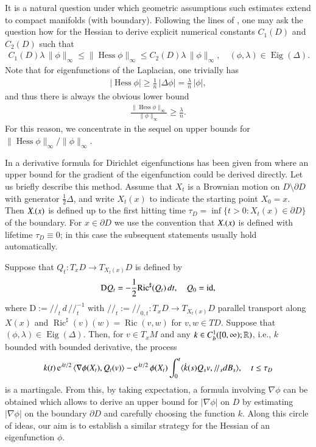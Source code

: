 \documentclass[11pt,reqno]{amsart}
\theoremstyle{definition} \newtheorem{remark}[theorem]{Remark}
\numberwithin{equation}{section}
\def\Ric{{\operatorname{Ric}}} \def\Hess{\operatorname{Hess}}
\newcommand\1{\mathbbm{1}}
\def\Ric{{\operatorname{Ric}}} \def\Aut{{\operatorname{Aut}}}
\def\Eig{\operatorname{Eig}} \def\II{{\operatorname{II}}}
\def\mathpal#1{\mathop{\mathchoice{\text{\rm #1}}%
    {\text{\rm #1}}{\text{\rm #1}}%
    {\text{\rm #1}}}\nolimits} \def\id{{\mathpal{id}}}
\newcommand{\ptr}{/\!/}
\def\II{{\operatorname{II}}}
\def\id{{\mathpal{id}}}
\def\mathpal#1{\mathop{\mathchoice{\text{\rm #1}}%
      {\text{\rm #1}}{\text{\rm #1}}%
      {\text{\rm #1}}}\nolimits}
\begin{document}
It is a natural question under which geometric assumptions such estimates
extend to compact manifolds (with boundary).
Following the lines of \cite{ATW}, one may ask the question 
how for the Hessian to derive explicit numerical constants $C_1(D)$ and $C_2(D)$ such that
\begin{align}\label{aim-ineq}
  C_{1}(D) {\lambda}\,\|\phi\|_{\infty} \leqslant\|\Hess \phi\|_{\infty} \leqslant C_{2}(D) {\lambda}\,\|\phi\|_{\infty}, \quad(\phi,\lambda) \in \Eig(\Delta).
\end{align}
Note that for eigenfunctions of the Laplacian, one trivially has
\begin{align*}
  |\Hess \phi|\geq \frac1n\,|\Delta \phi|=\frac\lambda{n}\,|\phi|,
\end{align*}
and thus there is always the obvious lower bound
\begin{align*}
\frac{\|\Hess \phi\|_{\infty}}{\|\phi\|_{\infty}}\geq \frac\lambda{n}.
\end{align*}
For this reason, we concentrate in the sequel on upper bounds for
${\|\Hess\phi\|_{\infty}}/{\|\phi\|_{\infty}}$.

In \cite{ATW} a derivative formula for Dirichlet eigenfunctions has been
given from where an upper bound for the gradient of the 
eigenfunction could be derived directly.
Let us briefly describe this method. Assume that $X_t$ is a Brownian motion
on $D\setminus\partial D$ with generator $\frac12\Delta$, and
write $X_t(x)$ to indicate the starting point $X_0=x$.
Then $X{\bf.}(x)$ is defined up to the first hitting time
$\tau_D=\inf\{t>0\colon X_t(x)\in\partial D\}$  of the boundary.
For $x\in\partial D$ we use the convention that $X{\bf.}(x)$ is defined with lifetime
$\tau_D\equiv0$; in this case the subsequent statements usually hold automatically.

Suppose that $Q_t\colon T_xD\rightarrow T_{X_t(x)}D$ is defined by
\begin{align*}
  \text{D}Q_t=-\frac12\Ric^{\sharp}(Q_t)\, d t, \quad  Q_0=\id,
\end{align*}
where $\text{D}:=\ptr_t\,d \,\ptr_t^{-1}$ with
$\ptr_t:=\ptr_{0,t}\colon T_{x}D \rightarrow T_{X_{t}(x)}D$ parallel
transport along $X(x)$ and $\Ric^{\sharp}(v)(w)=\Ric(v,w)$ for $v,w \in TD$. Suppose that
$(\phi,\lambda) \in \Eig(\Delta)$.  Then, for $v\in T_xM$ and any
$k\in C^1_b([0,\infty);\mathbb{R})$, i.e.,
$k$ bounded with bounded derivative, the process
\begin{align*}
  k(t)\e^{\lambda t/2}\,\langle \nabla \phi (X_t),Q_t(v)\rangle-\e^{\lambda t/2}\phi(X_t)\int_0^t
  \langle \dot{k}(s)Q_s v,\ptr_s dB_s \rangle,\quad t\leq \tau_D
\end{align*}
is a martingale.  From this, by taking expectation, a formula
involving $\nabla\phi$ can be obtained which allows to derive an upper
bound for $|\nabla \phi|$ on $D$ by estimating $|\nabla \phi|$ on the
boundary $\partial D$ and carefully choosing the function $k$.  Along
this circle of ideas, our aim is to establish a similar strategy
for the Hessian of an eigenfunction $\phi$.
\end{document}
